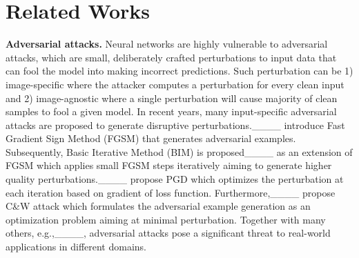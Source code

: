 \section{Related Works}
\label{sec:related}

\textbf{Adversarial attacks.} 
Neural networks are highly vulnerable to adversarial attacks, which are small, deliberately crafted perturbations to input data that can fool the model into making incorrect predictions. Such perturbation can be 1) image-specific where the attacker computes a perturbation for every clean input and 2) image-agnostic where a single perturbation will cause majority of clean samples to fool a given model. In recent years, many input-specific adversarial attacks are proposed to generate disruptive perturbations.____ introduce Fast Gradient Sign Method (FGSM) that generates adversarial examples. 
Subsequently, Basic Iterative Method (BIM) is proposed____ as an extension of FGSM which applies small FGSM steps iteratively aiming to generate higher quality perturbations.____ propose PGD which optimizes the perturbation at each iteration based on gradient of loss function. 
Furthermore,____ propose C\&W attack which formulates the adversarial example generation as an optimization problem aiming at minimal perturbation. Together with many others, e.g.,____, adversarial attacks pose a significant threat to real-world applications in different domains.

